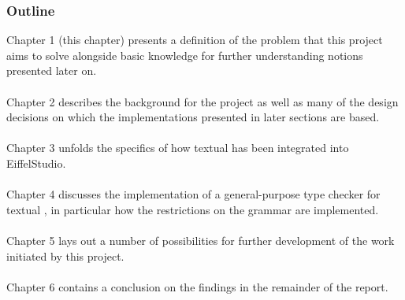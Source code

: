 \subsubsection{Outline}
Chapter 1 (this chapter) presents a definition of the problem that this project aims to solve alongside basic knowledge for further understanding notions presented later on.
\paragraph{}
Chapter 2 describes the background for the project as well as many of the design decisions on which the implementations presented in later sections are based.
\paragraph{}
Chapter 3 unfolds the specifics of how textual \bon{} has been integrated into EiffelStudio.
\paragraph{}
Chapter 4 discusses the implementation of a general-purpose type checker for textual \bon{}, in particular how the restrictions on the grammar are implemented.
\paragraph{}
Chapter 5 lays out a number of possibilities for further development of the work initiated by this project.
\paragraph{}
Chapter 6 contains a conclusion on the findings in the remainder of the report.

